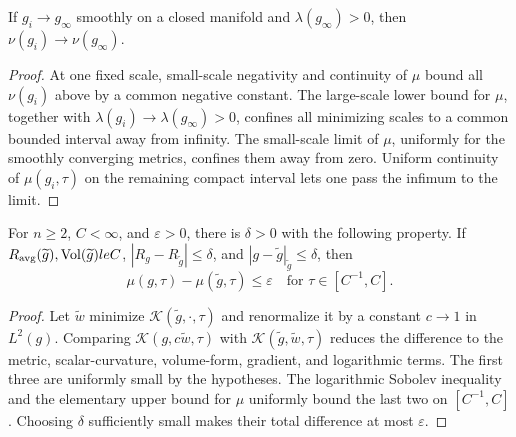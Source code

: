 \begin{lemma}
\label{lem:chow-iii-ch17-nu-continuity-positive-lambda}


If $g_i\to g_\infty$ smoothly on a closed manifold and
$\lambda(g_\infty)>0$, then $\nu(g_i)\to\nu(g_\infty)$.
\end{lemma}
\begin{proof}
\sketch At one fixed scale, small-scale negativity and continuity of $\mu$ bound all
$\nu(g_i)$ above by a common negative constant.  The large-scale lower bound
for $\mu$, together with $\lambda(g_i)\to\lambda(g_\infty)>0$, confines all
minimizing scales to a common bounded interval away from infinity.  The
small-scale limit of $\mu$, uniformly for the smoothly converging metrics,
confines them away from zero.  Uniform continuity of $\mu(g_i,\tau)$ on the
remaining compact interval lets one pass the infimum to the limit.
\end{proof}

\begin{lemma}
\label{lem:chow-iii-ch17-mu-continuity}

For $n\ge2$, $C<\infty$, and $\varepsilon>0$, there is $\delta>0$ with
the following property.  If $R_{\rm avg}(\widetilde g),\operatorname{Vol}(\widetilde g)le C$,
$|R_g-R_{\widetilde g}|\le\delta$, and
$|g-\widetilde g|_{\widetilde g}\le\delta$, then
\[
 \mu(g,\tau)-\mu(\widetilde g,\tau)\le\varepsilon
 \quad\text{for }\tau\in[C^{-1},C].
\]
\end{lemma}
\begin{proof}
\sketch Let $\widetilde w$ minimize $\mathcal K(\widetilde g,\cdot,\tau)$ and
renormalize it by a constant $c\to1$ in $L^2(g)$.  Comparing
$\mathcal K(g,c\widetilde w,\tau)$ with
$\mathcal K(\widetilde g,\widetilde w,\tau)$ reduces the difference to the
metric, scalar-curvature, volume-form, gradient, and logarithmic terms.
The first three are uniformly small by the hypotheses.  The logarithmic
Sobolev inequality and the elementary upper bound for $\mu$ uniformly bound
the last two on $[C^{-1},C]$.  Choosing $\delta$ sufficiently small makes
their total difference at most $\varepsilon$.
\end{proof}

